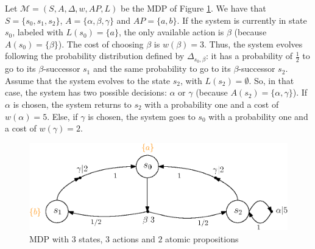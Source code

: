 \begin{example}\label{simple-mdp}
  Let $\mathcal{M} = (S, A, \Delta, w, AP, L)$ be the MDP of Figure \ref{mdp01}. We have that $S = \{s_0, s_1, s_2\}$, $A = \{\alpha, \beta, \gamma\}$ and $AP=\{a, b\}$. If the system is currently in state $s_0$, labeled with $L(s_0) = \{a\}$, the only available action is $\beta$ (because $A(s_0) = \{\beta\}$).
  The cost of choosing $\beta$ is $w(\beta) = 3$.
  Thus, the system evolves following the probability distribution defined by $\Delta_{s_0, \beta}$: it has a probability of $\frac{1}{2}$
  to go to its $\beta$-successor $s_1$ and the same probability to go to its $\beta$-successor $s_2$. Assume that the system evolves to the state $s_2$, with $L(s_2) = \emptyset$. So, in that case, the system has two possible decisions: $\alpha$ or $\gamma$ (because $A(s_2) = \{\alpha, \gamma\}$). If $\alpha$ is chosen, the system returns to $s_2$ with a probability one and a cost of $w(\alpha) = 5$. Else, if $\gamma$ is chosen, the system goes to $s_0$ with a probability one and a cost of $w(\gamma) = 2$.
  \begin{figure}[h!]
    \centering
    \includegraphics[width=0.7\linewidth]{resources/simple-mdp}
    \caption{MDP with $3$ states, $3$ actions and $2$ atomic propositions}\label{mdp01}
  \end{figure}
\end{example}

